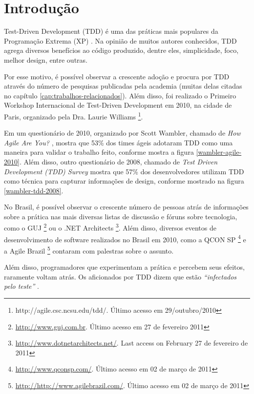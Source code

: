 \chapter{Introdução}
\label{cap:introducao}

Test-Driven Development (TDD) é uma das práticas mais populares da Programação
Extrema (XP) \cite{XPExplained}. 
Na opinião de muitos autores conhecidos, TDD agrega diversos benefícios ao
código produzido, dentre eles, simplicidade, foco, melhor design, entre outras.

Por esse motivo, é possível observar a crescente adoção e procura por TDD
através do número de pesquisas publicadas pela academia (muitas delas citadas no capítulo 
\ref{cap:trabalhos-relacionados}). Além disso, foi realizado o Primeiro Workshop
Internacional de Test-Driven Development em 2010, na cidade de Paris, organizado
pela Dra. Laurie Williams \footnote{http://agile.csc.ncsu.edu/tdd/. Último
acesso em 29/outubro/2010}.

Em um questionário de 2010, organizado por Scott Wambler, chamado de \textit{How
Agile Are You?} \cite{wambler-survey-agile}, mostra que 53\% dos times ágeis
adotaram TDD como uma maneira para validar o trabalho feito, conforme mostra a 
figura \ref{wambler-agile-2010}. Além disso, outro questionário de 2008, 
chamado de \textit{Test Driven Development (TDD) Survey}
\cite{wambler-survey-tdd}  mostra que 57\% dos desenvolvedores utilizam TDD como
técnica para capturar informações de design, conforme mostrado na figura 
\ref{wambler-tdd-2008}. 

No Brasil, é possível observar o crescente número de pessoas atrás de
informações sobre a prática nas mais diversas listas de discussão e fóruns sobre
tecnologia, como o GUJ \footnote{\url{http://www.guj.com.br}.
Último acesso em 27 de fevereiro 2011} ou o .NET Architects 
\footnote{\url{http://www.dotnetarchitects.net/}. Last access on February
27 de fevereiro de 2011}. Além disso, diversos eventos de desenvolvimento de
software realizados no Brasil em 2010, como a QCON SP
\footnote{\url{http://www.qconsp.com/}. Último acesso em 02 de março de 2011} e
a Agile Brazil \footnote{\url{http://http://www.agilebrazil.com/}. Último acesso
em 02 de março de 2011} contaram com palestras sobre o assunto.

Além disso, programadores que experimentam a prática e percebem seus
efeitos, raramente voltam atrás. Os aficionados por TDD dizem que estão
\textit{``infectados pelo teste''} \cite{tdd-fearless}.


